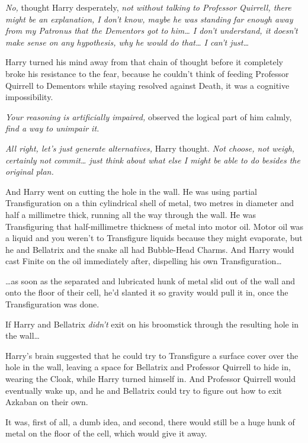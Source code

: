 \emph{No,} thought Harry desperately, \emph{not without talking to Professor
Quirrell, there might be an explanation, I don't know, maybe he was standing
far enough away from my Patronus that the Dementors got to him{\ldots} I don't
understand, it doesn't make sense on any hypothesis, why he would do
that{\ldots} I can't just{\ldots}\\
}

Harry turned his mind away from that chain of thought before it completely
broke his resistance to the fear, because he couldn't think of feeding
Professor Quirrell to Dementors while staying resolved against Death, it was a
cognitive impossibility.

\emph{Your reasoning is artificially impaired,} observed the logical part of
him calmly, \emph{find a way to unimpair it.}

\emph{All right, let's just generate alternatives,} Harry thought. \emph{Not
choose, not weigh, certainly not commit{\ldots} just think about what else I
might be able to do besides the original plan.}

And Harry went on cutting the hole in the wall. He was using partial
Transfiguration on a thin cylindrical shell of metal, two metres in diameter
and half a millimetre thick, running all the way through the wall. He was
Transfiguring that half-millimetre thickness of metal into motor oil. Motor oil
was a liquid and you weren't to Transfigure liquids because they might
evaporate, but he and Bellatrix and the snake all had Bubble-Head Charms. And
Harry would cast Finite on the oil immediately after, dispelling his own
Transfiguration{\ldots}

{\ldots}as soon as the separated and lubricated hunk of metal slid out of the
wall and onto the floor of their cell, he'd slanted it so gravity would pull it
in, once the Transfiguration was done.

If Harry and Bellatrix \emph{didn't} exit on his broomstick through the
resulting hole in the wall{\ldots}

Harry's brain suggested that he could try to Transfigure a surface cover over
the hole in the wall, leaving a space for Bellatrix and Professor Quirrell to
hide in, wearing the Cloak, while Harry turned himself in. And Professor
Quirrell would eventually wake up, and he and Bellatrix could try to figure out
how to exit Azkaban on their own.

It was, first of all, a dumb idea, and second, there would still be a huge hunk
of metal on the floor of the cell, which would give it away.

